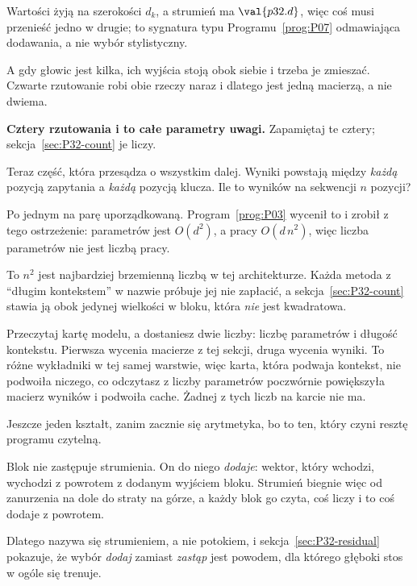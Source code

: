 \begin{fr}

Wartości żyją na szerokości $d_k$, a strumień ma $\val{p32.d}$, więc coś musi
przenieść jedno w drugie; to sygnatura typu Programu~\ref{prog:P07}
odmawiająca dodawania, a nie wybór stylistyczny.

A gdy głowic jest kilka, ich wyjścia stoją obok siebie i trzeba je zmieszać.
Czwarte rzutowanie robi obie rzeczy naraz i dlatego jest jedną macierzą, a
nie dwiema.

\textbf{Cztery rzutowania i to całe parametry uwagi.} Zapamiętaj te cztery;
sekcja~\ref{sec:P32-count} je liczy.

Teraz część, która przesądza o wszystkim dalej. Wyniki powstają między
\emph{każdą} pozycją zapytania a \emph{każdą} pozycją klucza. Ile to wyników
na sekwencji $n$ pozycji?
\dotline
\nextframe
\end{fr}

\begin{fr}

Po jednym na parę uporządkowaną. Program~\ref{prog:P03} wycenił to i zrobił z
tego ostrzeżenie: parametrów jest $O(d^{2})$, a pracy $O(d\,n^{2})$, więc
liczba parametrów nie jest liczbą pracy.

To $n^{2}$ jest najbardziej brzemienną liczbą w tej architekturze. Każda
metoda z \enquote{długim kontekstem} w nazwie próbuje jej nie zapłacić, a
sekcja~\ref{sec:P32-count} stawia ją obok jedynej wielkości w bloku, która
\emph{nie} jest kwadratowa.

\begin{aibox}
Przeczytaj kartę modelu, a dostaniesz dwie liczby: liczbę parametrów i
długość kontekstu. Pierwsza wycenia macierze z tej sekcji, druga wycenia
wyniki. To różne wykładniki w tej samej warstwie, więc karta, która podwaja
kontekst, nie podwoiła niczego, co odczytasz z liczby parametrów \dash{}
poczwórnie powiększyła macierz wyników i podwoiła cache. Żadnej z tych liczb
na karcie nie ma.
\end{aibox}
\end{fr}


\begin{fr}
Jeszcze jeden kształt, zanim zacznie się arytmetyka, bo to ten, który czyni
resztę programu czytelną.

Blok nie zastępuje strumienia. On do niego \emph{dodaje}: wektor, który
wchodzi, wychodzi z powrotem z dodanym wyjściem bloku. Strumień biegnie więc
od zanurzenia na dole do straty na górze, a każdy blok go czyta, coś liczy i
to coś dodaje z powrotem.

Dlatego nazywa się strumieniem, a nie potokiem, i
sekcja~\ref{sec:P32-residual} pokazuje, że wybór \emph{dodaj} zamiast
\emph{zastąp} jest powodem, dla którego głęboki stos w ogóle się trenuje.
\end{fr}

